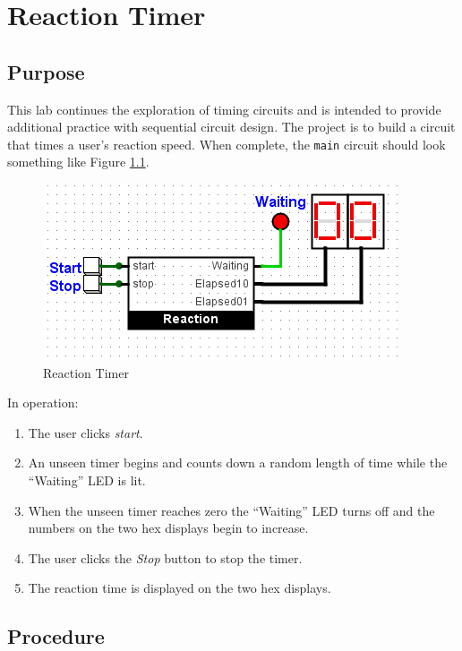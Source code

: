 \chapter{Reaction Timer}

\section{Purpose}

This lab continues the exploration of timing circuits and is intended to provide additional practice with sequential circuit design. The project is to build a circuit that times a user's reaction speed. When complete, the \lstinline[columns=fixed]|main| circuit should look something like Figure \ref{fig:08-01}.

\begin{figure}[H]
	\centering
	\includegraphics[width=\maxwidth{.95\linewidth}]{gfx/08-01}
	\caption{Reaction Timer}
	\label{fig:08-01}
\end{figure}

In operation:

\begin{enumerate}
	\item The user clicks \textit{start}. 
	\item An unseen timer begins and counts down a random length of time while the ``Waiting'' LED is lit. 
	\item When the unseen timer reaches zero the ``Waiting'' LED turns off and the numbers on the two hex displays begin to increase.
	\item The user clicks the \textit{Stop} button to stop the timer.
	\item The reaction time is displayed on the two hex displays.
\end{enumerate}

\section{Procedure}

